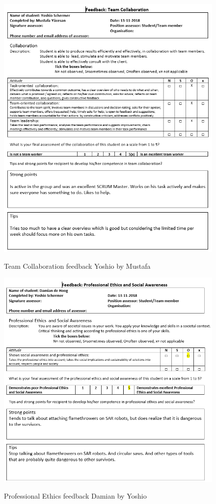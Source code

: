 \documentclass[12pt]{article}
\begin{document}
	\begin{figure}[p!]
		\centering
		\includegraphics[width=\columnwidth]{CoopYoshio2.PNG}\\
		\caption{Team Collaboration feedback Yoshio by Mustafa}
	\end{figure}
	\begin{figure}[p!]
	\centering
	\includegraphics[width=\columnwidth]{ProfEthDamian3.PNG}\\
	\caption{Professional Ethics feedback Damian by Yoshio}
	\end{figure}
\end{document}
